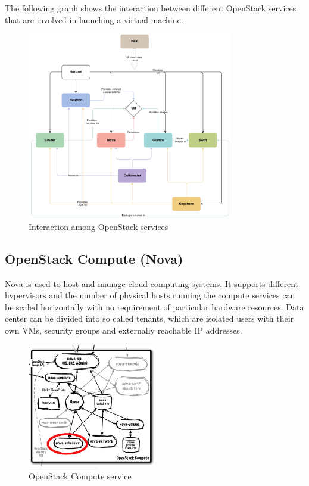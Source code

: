 The following graph shows the interaction between different OpenStack services that are involved in launching a virtual machine.

\begin{figure}[H]
\centering
\includegraphics[width=0.8\textwidth]{images/fundamentals/openstack_conceptual_arch.png}
\caption{Interaction among OpenStack services}
\end{figure}


\subsection{OpenStack Compute (Nova)}

Nova is used to host and manage cloud computing systems. It supports different hypervisors and the number of physical hosts running the compute services can be scaled horizontally with no requirement of particular hardware resources. Data center can be divided into so called tenants, which are isolated users with their own VMs, security groups and externally reachable IP addresses.

\begin{figure}[H]
\centering
\includegraphics[width=0.5\textwidth]{images/fundamentals/openstack_nova.png}
\caption{OpenStack Compute service}
\end{figure}

